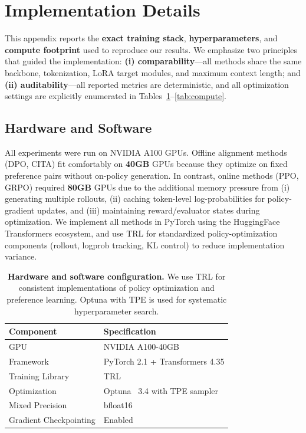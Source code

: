 \section{Implementation Details}
\label{sec:appendix_implementation}

\vspace{-0.25em}
\noindent
This appendix reports the \textbf{exact training stack}, \textbf{hyperparameters}, and \textbf{compute footprint} used to reproduce our results.
We emphasize two principles that guided the implementation:
\textbf{(i) comparability}---all methods share the same backbone, tokenization, LoRA target modules, and maximum context length; and
\textbf{(ii) auditability}---all reported metrics are deterministic, and all optimization settings are explicitly enumerated in Tables~\ref{tab:hardware}--\ref{tab:compute}.

\subsection{Hardware and Software}

\vspace{-0.25em}
\noindent
All experiments were run on NVIDIA A100 GPUs. Offline alignment methods (\textsc{DPO}, \textsc{CITA}) fit comfortably on \textbf{40GB} GPUs because they optimize on fixed preference pairs without on-policy generation.
In contrast, online methods (\textsc{PPO}, \textsc{GRPO}) required \textbf{80GB} GPUs due to the additional memory pressure from (i) generating multiple rollouts, (ii) caching token-level log-probabilities for policy-gradient updates, and (iii) maintaining reward/evaluator states during optimization.
We implement all methods in PyTorch using the HuggingFace Transformers ecosystem, and use TRL for standardized policy-optimization components (rollout, logprob tracking, KL control) to reduce implementation variance.

\begin{table}[H]
\centering
\small
\renewcommand{\arraystretch}{1.2}
\begin{tabular}{@{}ll@{}}
\toprule
\textbf{Component} & \textbf{Specification} \\
\midrule
GPU & NVIDIA A100-40GB \\ \hline
Framework & PyTorch 2.1 + Transformers 4.35 \\ \hline
Training Library & TRL~\cite{tunstall2023zephyr} \\ \hline
Optimization & Optuna~\cite{akiba2019optuna} 3.4 with TPE sampler \\ \hline
Mixed Precision & bfloat16 \\ \hline
Gradient Checkpointing & Enabled \\
\bottomrule
\end{tabular}
\caption{\textbf{Hardware and software configuration.} We use TRL for consistent implementations of policy optimization and preference learning. Optuna with TPE is used for systematic hyperparameter search.}
\label{tab:hardware}
\end{table}

